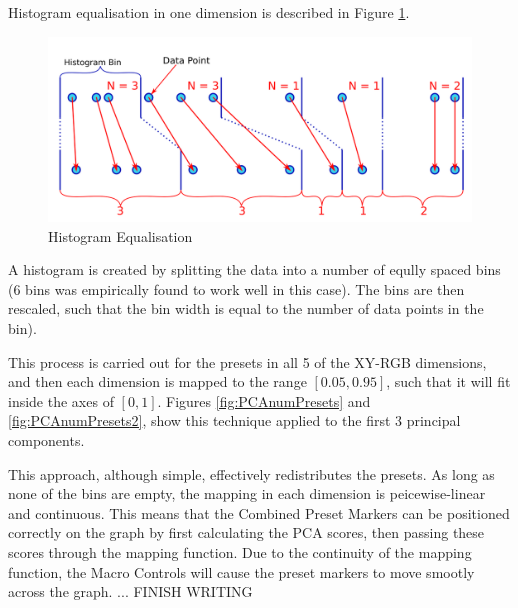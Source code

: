 \documentclass[11pt, oneside]{report}   	%
\begin{document}
Histogram equalisation in one dimension is described in Figure \ref{fig:HistEq}.\\
\begin{figure}[h] 
	\centering
	\includegraphics[width = 6in]{HistogramEquilisation.png}
	\caption{Histogram Equalisation}
	\label{fig:HistEq}
\end{figure}
A histogram is created by splitting the data into a number of eqully spaced bins (6 bins was empirically found to work well in this case). The bins are then rescaled, such that the bin width is equal to the number of data points in the bin).

This process is carried out for the presets in all 5 of the XY-RGB dimensions, and then each dimension is mapped to the range $[0.05, 0.95]$, such that it will fit inside the axes of $[0, 1]$. Figures \ref{fig:PCAnumPresets} and \ref{fig:PCAnumPresets2}, show this technique applied to the first 3 principal components.

This approach, although simple, effectively redistributes the presets. As long as none of the bins are empty, the mapping in each dimension is peicewise-linear and continuous. This means that the Combined Preset Markers can be positioned correctly on the graph by first calculating the PCA scores, then passing these scores through the mapping function. Due to the continuity of the mapping function, the Macro Controls will cause the preset markers to move smootly across the graph. ... FINISH WRITING
\end{document}
